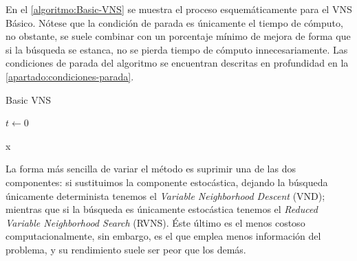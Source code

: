 En el \autoref{algoritmo:Basic-VNS} se muestra el proceso esquemáticamente para el VNS Básico. Nótese que la condición de parada es únicamente el tiempo de cómputo, no obstante, se suele combinar con un porcentaje mínimo de mejora de forma que si la búsqueda se estanca, no se pierda tiempo de cómputo innecesariamente. Las condiciones de parada del algoritmo se encuentran descritas en profundidad en la \autoref{apartado:condiciones-parada}.

\begin{algorithm}[htbp]
	\caption{Basic VNS~\cite{vns}}
	\label{algoritmo:Basic-VNS}
	
	\DontPrintSemicolon

	\bigskip
	
	$t \leftarrow 0$ \;
	
	
	\Return x \;
	
\end{algorithm}


%
La forma más sencilla de variar el método es suprimir una de las dos componentes: si sustituimos la componente estocástica, dejando la búsqueda únicamente determinista tenemos el \textit{Variable Neighborhood Descent} (VND); mientras que si la búsqueda es únicamente estocástica tenemos el \textit{Reduced Variable Neighborhood Search} (RVNS). Éste último es el menos costoso computacionalmente, sin embargo, es el que emplea menos información del problema, y su rendimiento suele ser peor que los demás.

